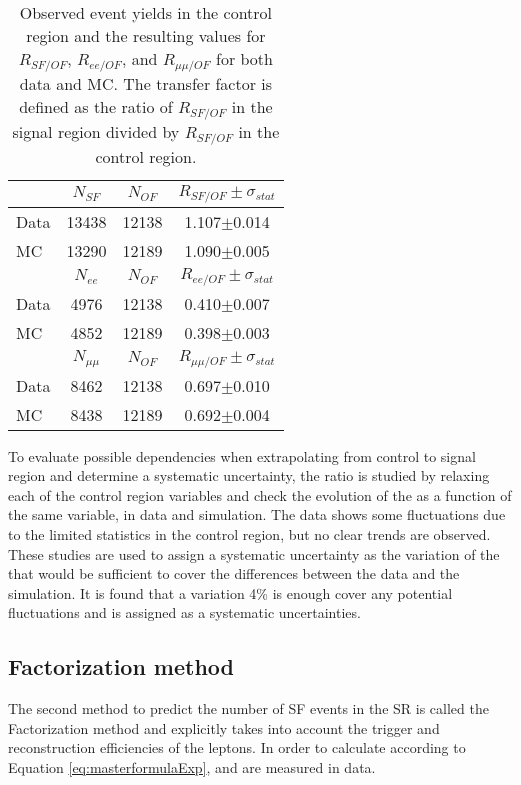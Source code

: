 \begin{table}[ht!]
\def\arraystretch{1.2}
\setlength{\belowcaptionskip}{6pt} 
\small                            
\centering                           
\caption{Observed event yields in the control region and the resulting values for $R_{SF/OF}$, $R_{ee/OF}$, and $R_{\mu\mu/OF}$ for both data and MC. 
The transfer factor is defined as the ratio of $R_{SF/OF}$ in the signal region divided by $R_{SF/OF}$ in the control region.}
\label{tab:rSFOF}
\begin{tabular}{ l c c c}
        \hline \hline
        & $N_{SF}$ & $N_{OF}$ & $ R_{SF/OF} \pm \sigma_{stat}$  \\    
        \hline
         Data & 13438 & 12138 & 1.107$\pm$0.014\\
         MC   & 13290 & 12189 & 1.090$\pm$0.005\\ 
        \hline
         & $N_{ee}$ & $N_{OF}$ & $ R_{ee/OF} \pm \sigma_{stat}$ \\    
        \hline
         Data & 4976 & 12138 & 0.410$\pm$0.007 \\
         MC   & 4852 & 12189 & 0.398$\pm$0.003 \\
        \hline
         & $N_{\mu\mu}$ & $N_{OF}$ & $ R_{\mu\mu/OF} \pm \sigma_{stat}$\\    
        \hline
         Data & 8462 & 12138 & 0.697$\pm$0.010 \\
         MC   & 8438 & 12189 & 0.692$\pm$0.004 \\ \hline\hline
\end{tabular}
\end{table}                                                                                                                                                                    
To evaluate possible dependencies when extrapolating from control to signal region and determine a systematic uncertainty, the ratio \Rsfof is studied by relaxing each of the control region variables and check the evolution of the \Rsfof as a function of the same variable, in data and simulation.  
The data shows some fluctuations due to the limited statistics in the control region, but no clear trends are observed.
These studies are used to assign a systematic uncertainty as the variation of the \Rsfof that would be sufficient to cover the differences between the data and the simulation. 
It is found that a variation 4\% is enough cover any potential fluctuations and is assigned as a systematic uncertainties. 
\subsection*{Factorization method}\label{sec:factorizationMethod}
\noindent
\justify
The second method to predict the number of SF events in the SR is called the Factorization method and explicitly takes into account the trigger and reconstruction efficiencies of the leptons.   
In order to calculate \Rsfof according to Equation \ref{eq:masterformulaExp}, \rmue and \RT are measured in data.
